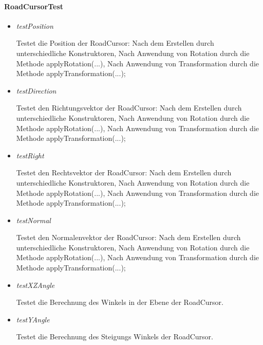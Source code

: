 \paragraph{RoadCursorTest}
\begin{itemize}
	\item \textit{testPosition}
        \begin{leftbar}[0.9\linewidth]
			Testet die Position der RoadCursor:
			Nach dem Erstellen durch unterschiedliche Konstruktoren,
			Nach Anwendung von Rotation durch die Methode applyRotation(...),
			Nach Anwendung von Transformation durch die Methode applyTransformation(...);
		\end{leftbar}
	\item \textit{testDirection}
        \begin{leftbar}[0.9\linewidth]
			Testet den Richtungsvektor der RoadCursor:
			Nach dem Erstellen durch unterschiedliche Konstruktoren,
			Nach Anwendung von Rotation durch die Methode applyRotation(...),
			Nach Anwendung von Transformation durch die Methode applyTransformation(...);
		\end{leftbar}
	\item \textit{testRight}
        \begin{leftbar}[0.9\linewidth]
			Testet den Rechtsvektor der RoadCursor:
			Nach dem Erstellen durch unterschiedliche Konstruktoren,
			Nach Anwendung von Rotation durch die Methode applyRotation(...),
			Nach Anwendung von Transformation durch die Methode applyTransformation(...);
		\end{leftbar}
	\item \textit{testNormal}
        \begin{leftbar}[0.9\linewidth]
			Testet den Normalenvektor der RoadCursor:
			Nach dem Erstellen durch unterschiedliche Konstruktoren,
			Nach Anwendung von Rotation durch die Methode applyRotation(...),
			Nach Anwendung von Transformation durch die Methode applyTransformation(...);
		\end{leftbar}
	\item \textit{testXZAngle}
        \begin{leftbar}[0.9\linewidth]
			Testet die Berechnung des Winkels in der Ebene der RoadCursor.
		\end{leftbar}
	\item \textit{testYAngle}
        \begin{leftbar}[0.9\linewidth]
			Testet die Berechnung des Steigungs Winkels der RoadCursor.
		\end{leftbar}

\end{itemize}
